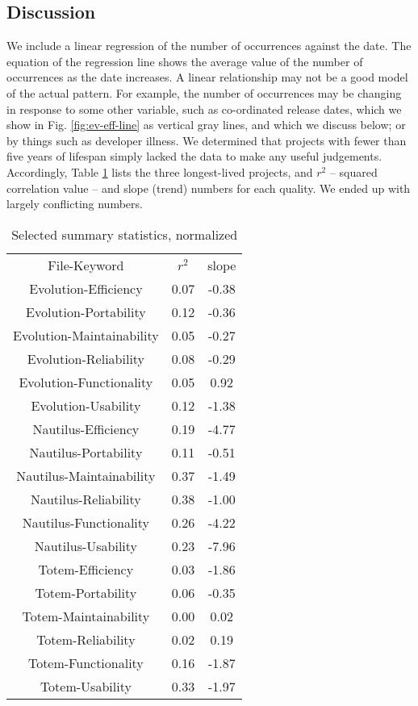 \documentclass[conference, compsoc]{IEEEtran}
\begin{document}
\subsection{Discussion}
We include a linear regression of the number of occurrences against the date. The equation of the regression line shows the average value of the number of occurrences as the date increases. A linear relationship may not be a good model of the actual pattern. For example, the number of occurrences may be changing in response to some other variable, such as co-ordinated release dates, which we show in Fig. \ref{fig:ev-eff-line} as vertical gray lines, and which we discuss below; or by things such as developer illness. We determined that projects with fewer than five years of lifespan simply lacked the data to make any useful judgements. Accordingly, Table \ref{tbl:summary} lists the three longest-lived projects, and $r^2$  -- squared correlation value -- and slope (trend) numbers for each quality. We ended up with largely conflicting numbers. 


\begin{table}
	\caption{Selected summary statistics, normalized}
	\centering
	\label{tbl:summary}
\begin{tabular}{|c|c|c|}
\hline
\rowcolor[gray]{.9} 
File-Keyword &  $r^2$ &  slope \\
Evolution-Efficiency & 0.07 & -0.38 \\
Evolution-Portability & 0.12 & -0.36 \\
Evolution-Maintainability & 0.05 & -0.27 \\
Evolution-Reliability & 0.08 & -0.29 \\
Evolution-Functionality & 0.05 & 0.92 \\
Evolution-Usability & 0.12 & -1.38 \\
Nautilus-Efficiency & 0.19 & -4.77 \\
Nautilus-Portability & 0.11 & -0.51 \\
Nautilus-Maintainability & 0.37 & -1.49 \\
Nautilus-Reliability & 0.38 & -1.00 \\
Nautilus-Functionality & 0.26 & -4.22 \\
Nautilus-Usability & 0.23 & -7.96 \\
Totem-Efficiency & 0.03 & -1.86 \\
Totem-Portability & 0.06 & -0.35 \\
Totem-Maintainability & 0.00 & 0.02 \\
Totem-Reliability & 0.02 & 0.19 \\
Totem-Functionality & 0.16 & -1.87 \\
Totem-Usability & 0.33 & -1.97 \\
\hline
\end{tabular}
\end{table}
\end{document}
